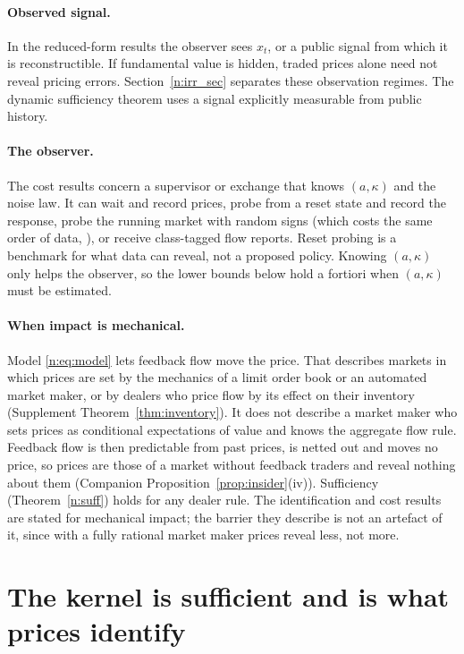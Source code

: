 \documentclass[12pt]{article}
\theoremstyle{definition}
\theoremstyle{remark}
\begin{document}
\paragraph{Observed signal.} In the reduced-form results the observer sees $x_t$, or a public signal from which it is reconstructible. If fundamental value is hidden, traded prices alone need not reveal pricing errors. Section~\ref{n:irr_sec} separates these observation regimes. The dynamic sufficiency theorem uses a signal explicitly measurable from public history.

\paragraph{The observer.} The cost results concern a supervisor or exchange that knows $(a,\kappa)$ and the noise law. It can wait and record prices, probe from a reset state and record the response, probe the running market with random signs (which costs the same order of data, \citealp[Theorem~S16.1]{niroula2026full}), or receive class-tagged flow reports. Reset probing is a benchmark for what data can reveal, not a proposed policy. Knowing $(a,\kappa)$ only helps the observer, so the lower bounds below hold a fortiori when $(a,\kappa)$ must be estimated.

\paragraph{When impact is mechanical.} Model \eqref{n:eq:model} lets feedback flow move the price. That describes markets in which prices are set by the mechanics of a limit order book or an automated market maker, or by dealers who price flow by its effect on their inventory (Supplement Theorem~\ref{thm:inventory}). It does not describe a market maker who sets prices as conditional expectations of value and knows the aggregate flow rule. Feedback flow is then predictable from past prices, is netted out and moves no price, so prices are those of a market without feedback traders and reveal nothing about them (Companion Proposition~\ref{prop:insider}(iv)). Sufficiency (Theorem~\ref{n:suff}) holds for any dealer rule. The identification and cost results are stated for mechanical impact; the barrier they describe is not an artefact of it, since with a fully rational market maker prices reveal less, not more.

\section{The kernel is sufficient and is what prices identify}\label{n:suff_sec}
\end{document}
